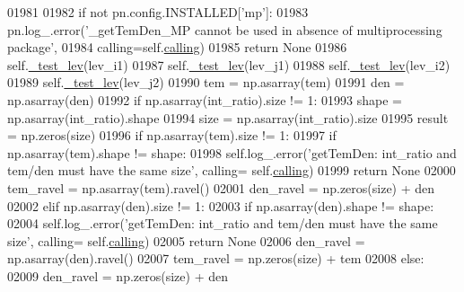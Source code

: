 \begin{DoxyCode}
{{01981         
01982         \textcolor{keywordflow}{if} \textcolor{keywordflow}{not} pn.config.INSTALLED[\textcolor{stringliteral}{'mp'}]:
01983             pn.log\_.error(\textcolor{stringliteral}{'\_getTemDen\_MP cannot be used in absence of multiprocessing package'},
01984                           calling=self.\hyperlink{classpyneb_1_1core_1_1pynebcore_1_1_atom_a373b7735acf4f528b54bddf373ad67a1}{calling})
01985             \textcolor{keywordflow}{return} \textcolor{keywordtype}{None}
01986         self.\hyperlink{classpyneb_1_1core_1_1pynebcore_1_1_atom_ade3de73e8bdb814d01d2d9af98eba87f}{\_test\_lev}(lev\_i1)
01987         self.\hyperlink{classpyneb_1_1core_1_1pynebcore_1_1_atom_ade3de73e8bdb814d01d2d9af98eba87f}{\_test\_lev}(lev\_j1)
01988         self.\hyperlink{classpyneb_1_1core_1_1pynebcore_1_1_atom_ade3de73e8bdb814d01d2d9af98eba87f}{\_test\_lev}(lev\_i2)
01989         self.\hyperlink{classpyneb_1_1core_1_1pynebcore_1_1_atom_ade3de73e8bdb814d01d2d9af98eba87f}{\_test\_lev}(lev\_j2)
01990         tem = np.asarray(tem)
01991         den = np.asarray(den)
01992         \textcolor{keywordflow}{if} np.asarray(int\_ratio).size != 1:
01993             shape = np.asarray(int\_ratio).shape
01994             size = np.asarray(int\_ratio).size
01995             result = np.zeros(size) 
01996             \textcolor{keywordflow}{if} np.asarray(tem).size != 1:
01997                 \textcolor{keywordflow}{if} np.asarray(tem).shape != shape:
01998                     self.log\_.error(\textcolor{stringliteral}{'getTemDen: int\_ratio and tem/den must have the same size'}, calling=
      self.\hyperlink{classpyneb_1_1core_1_1pynebcore_1_1_atom_a373b7735acf4f528b54bddf373ad67a1}{calling})
01999                     \textcolor{keywordflow}{return} \textcolor{keywordtype}{None}
02000                 tem\_ravel = np.asarray(tem).ravel()
02001                 den\_ravel = np.zeros(size) + den
02002             \textcolor{keywordflow}{elif} np.asarray(den).size != 1:
02003                 \textcolor{keywordflow}{if} np.asarray(den).shape != shape:
02004                     self.log\_.error(\textcolor{stringliteral}{'getTemDen: int\_ratio and tem/den must have the same size'}, calling=
      self.\hyperlink{classpyneb_1_1core_1_1pynebcore_1_1_atom_a373b7735acf4f528b54bddf373ad67a1}{calling})
02005                     \textcolor{keywordflow}{return} \textcolor{keywordtype}{None}
02006                 den\_ravel = np.asarray(den).ravel()
02007                 tem\_ravel = np.zeros(size) + tem
02008             \textcolor{keywordflow}{else}:
02009                 den\_ravel = np.zeros(size) + den
}}
\end{DoxyCode}

